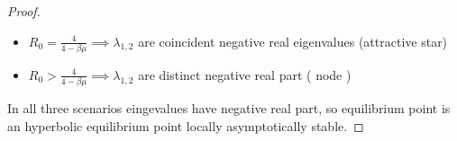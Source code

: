 \begin{proof}
\begin{itemize}
    \item $R_0 = \frac{4}{4-\beta \mu} \implies \lambda_{1,2}$ are coincident negative real eigenvalues (attractive star)
    
    \item $R_0 > \frac{4}{4-\beta \mu} \implies \lambda_{1,2}$ are distinct negative real part ( node )
\end{itemize}

In all three scenarios eingevalues have negative real part, so equilibrium point is an hyperbolic equilibrium point locally asymptotically stable.
\end{proof}